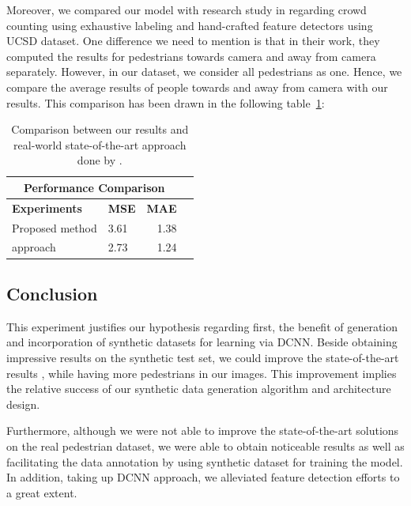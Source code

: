 \noindent Moreover, we compared our model with \citeauthor*{chan2008privacy} research study in \cite{chan2008privacy} regarding crowd counting using exhaustive labeling and hand-crafted feature detectors using UCSD dataset. One difference we need to mention is that in their work, they computed the results for pedestrians towards camera and away from camera separately. However, in our dataset, we consider all pedestrians as one. Hence, we compare the average results of people towards and away from camera with our results. This comparison has been drawn in the following table~\ref{finalres}:

\begin{table}[H]
\centering
\small\sffamily
\begin{tabular}{llrr}
\multicolumn{3}{c}{\textbf{\textbf{Performance Comparison}}} \\
\bottomrule
\textbf{Experiments} &\textbf{MSE} &\textbf{MAE} \\
\bottomrule
Proposed method                  &  3.61 & 1.38      \\
\citet{chan2008privacy} approach &  2.73 & 1.24      \\
\bottomrule
\end{tabular}
\caption{Comparison between our results and real-world state-of-the-art approach done by \citet{chan2008privacy}.}
\label{finalres}

\end{table} 


\subsection{Conclusion}

This experiment justifies our hypothesis regarding first, the benefit of generation and incorporation of synthetic datasets for learning via DCNN. Beside obtaining impressive results on the synthetic test set, we could improve the state-of-the-art results \cite{segui2015learning}, while having more pedestrians in our images. This improvement implies the relative success of our synthetic data generation algorithm and architecture design.

Furthermore, although we were not able to improve the state-of-the-art solutions on the real pedestrian dataset, we were able to obtain noticeable results as well as facilitating the data annotation by using synthetic dataset for training the model. In addition, taking up DCNN approach, we alleviated feature detection efforts to a great extent. 
